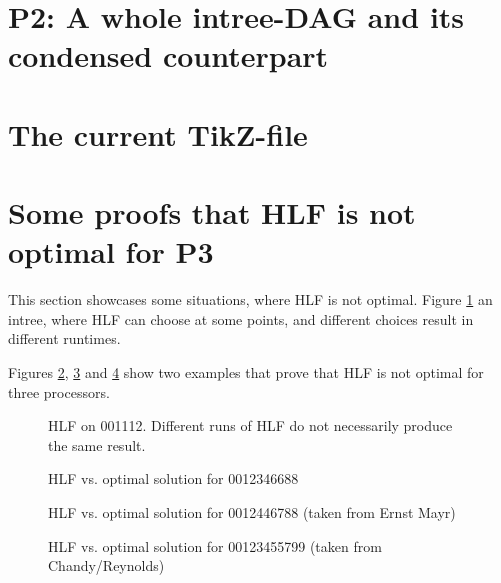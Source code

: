 \documentclass[letter]{report}
\begin{document}
\section{P2: A whole intree-DAG and its condensed counterpart}



%

\section{The current TikZ-file}



\section{Some proofs that HLF is not optimal for P3}

This section showcases some situations, where HLF is not optimal. Figure \ref{fig:hlf-001112} an intree, where HLF can choose at some points, and different choices result in different runtimes. 

Figures \ref{fig:hlf-vs-opt-0012346688}, \ref{fig:hlf-vs-opt-0012446788} and \ref{fig:hlf-vs-opt-00123455799} show two examples that prove that HLF is not optimal for three processors.

\begin{figure}[ht]
  \centering
  
  \caption{HLF on 001112. Different runs of HLF do not necessarily produce the same result.}
  \label{fig:hlf-001112}
\end{figure}

\begin{figure}[ht]
  \centering
  
  
  \caption{HLF vs. optimal solution for 0012346688}
  \label{fig:hlf-vs-opt-0012346688}
\end{figure}

\begin{figure}[ht]
  \centering
  
  
  \caption{HLF vs. optimal solution for 0012446788 (taken from Ernst Mayr)}
  \label{fig:hlf-vs-opt-0012446788}
\end{figure}

\begin{figure}[ht]
  \centering
  
  
  \caption{HLF vs. optimal solution for 00123455799 (taken from Chandy/Reynolds)}
  \label{fig:hlf-vs-opt-00123455799}
\end{figure}
\end{document}
